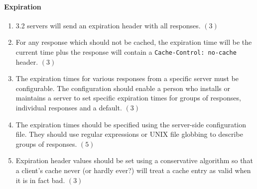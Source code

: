 \documentclass{article}
\begin{document}
\paragraph{Expiration}
\begin{enumerate}
\item 3.2 servers will send an expiration header with all responses. $(3)$
\item For any response which should not be cached, the expiration time will
  be the current time plus the response will contain a \texttt{Cache-Control:
    no-cache} header. $(3)$
\item The expiration times for various responses from a specific server must
  be configurable. The configuration should enable a person who installs or
  maintains a server to set specific expiration times for groups of
  responses, individual responses and a default. $(3)$
\item The expiration times should be specified using the server-side
  configuration file. They should use regular expressions or UNIX file
  globbing to describe groups of responses. $(5)$
\item Expiration header values should be set using a conservative algorithm
  so that a client's cache never (or hardly ever?) will treat a cache entry
  as valid when it is in fact bad. $(3)$
\end{enumerate}
\end{document}
